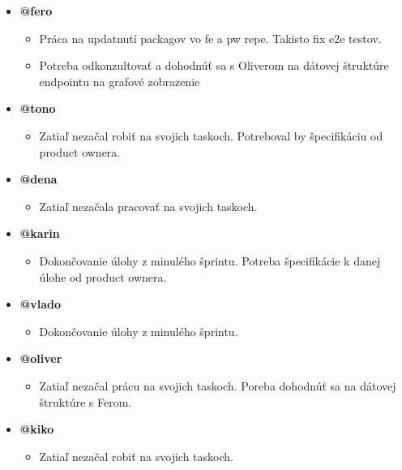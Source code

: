 \documentclass{article}
\begin{document}
    \begin{itemize}
        \item \textbf {@fero}
        \begin{itemize}
            \item Práca na updatnutí packagov vo fe a pw repe. Takisto fix e2e testov. 
            \item Potreba odkonzultovať a dohodnúť sa s Oliverom na dátovej štruktúre endpointu na grafové zobrazenie 
        \end{itemize}
        \item \textbf {@tono}
        \begin{itemize}
            \item Zatiaľ nezačal robiť na svojich taskoch. Potreboval by špecifikáciu od product ownera. 
        \end{itemize}
        \item \textbf {@dena}
        \begin{itemize}
            \item Zatiaľ nezačala pracovať na svojich taskoch.
        \end{itemize}
        \item \textbf {@karin}
        \begin{itemize}
            \item Dokončovanie úlohy z minulého šprintu. Potreba špecifikácie k danej úlohe od product ownera. 
        \end{itemize}
        \item \textbf {@vlado}
        \begin{itemize}
            \item Dokončovanie úlohy z minulého šprintu. 
        \end{itemize}
        \item \textbf {@oliver}
        \begin{itemize}
            \item Zatiaľ nezačal prácu na svojich taskoch. Poreba dohodnúť sa na dátovej štruktúre s Ferom. 
        \end{itemize}
        \item \textbf {@kiko}
        \begin{itemize}
            \item Zatiaľ nezačal robiť na svojich taskoch. 
        \end{itemize}
    \end{itemize}    
\end{document}
